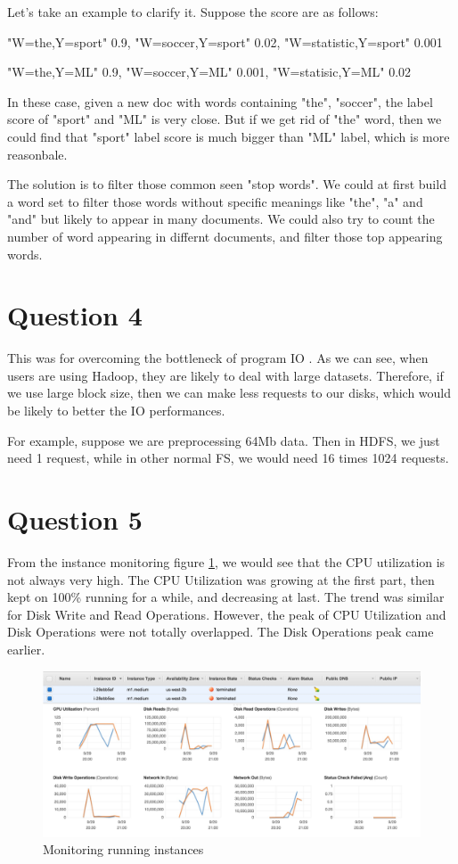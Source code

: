 \documentclass{article} %
\begin{document}
Let's take an example to clarify it. Suppose the score are as follows:

"W=the,Y=sport" 0.9, "W=soccer,Y=sport" 0.02, "W=statistic,Y=sport" 0.001

"W=the,Y=ML" 0.9, "W=soccer,Y=ML" 0.001, "W=statisic,Y=ML" 0.02

In these case, given a new doc with words containing "the", "soccer", the
label score of "sport" and "ML" is very close. But if we get rid of "the" word, then
we could find that "sport" label score is much bigger than "ML" label, which is
more reasonbale.

The solution is to filter those common seen "stop words". We could at first build a
word set to filter those words without specific meanings like "the", "a" and
"and" but likely to appear in many documents. We could also try to
count the number of word appearing in differnt documents, and filter those top
appearing words.



\section{Question 4}
This was for overcoming the bottleneck of program IO . As we can see, when users are
using Hadoop, they are likely to deal with large datasets. Therefore, if we use
large block size, then we can make less requests to our disks, which would be
likely to better the IO performances.

For example, suppose we are preprocessing 64Mb data. Then in HDFS, we just need
1 request, while in other normal FS, we would need 16 times 1024 requests.



\section{Question 5}
From the instance monitoring figure \ref{fig:monitoring}, we would see that the
CPU utilization is not always very high. The CPU Utilization was growing at the
first part, then kept on 100\% running for a while, and decreasing at last. The
trend was similar for Disk Write and Read Operations. However, the peak of CPU
Utilization and Disk Operations were not totally overlapped. The Disk Operations
peak came earlier.

\begin{figure}[h]
\begin{center}
\includegraphics[width=14cm]{pic/figure_3.png}
\end{center}
\caption{Monitoring running instances}
\label{fig:monitoring}
\end{figure}
\end{document}
